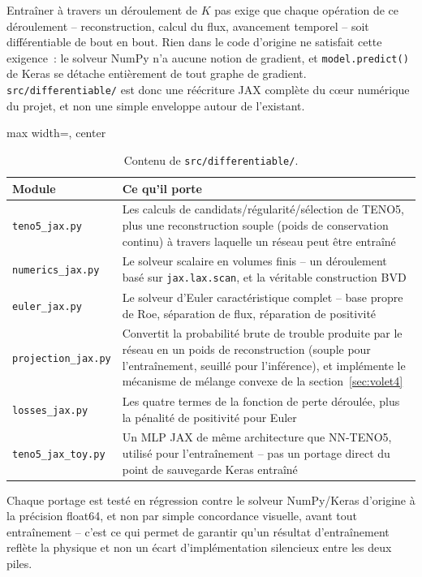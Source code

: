 \documentclass[11pt]{article}
\begin{document}
Entraîner à travers un déroulement de $K$ pas exige que chaque opération
de ce déroulement -- reconstruction, calcul du flux, avancement temporel
-- soit différentiable de bout en bout. Rien dans le code d'origine ne
satisfait cette exigence~: le solveur NumPy n'a aucune notion de
gradient, et \texttt{model.predict()} de Keras se détache entièrement de
tout graphe de gradient. \texttt{src/differentiable/} est donc une
réécriture JAX complète du c\oe{}ur numérique du projet, et non une simple
enveloppe autour de l'existant.

\begin{table}[htbp]
\begin{adjustbox}{max width=\textwidth, center}
\begin{tabular}{ll}
\toprule
\textbf{Module} & \textbf{Ce qu'il porte} \\
\midrule
\texttt{teno5\_jax.py} & Les calculs de candidats/régularité/sélection de
TENO5, plus une reconstruction souple (poids de conservation continu) à
travers laquelle un réseau peut être entraîné \\
\rowrule
\texttt{numerics\_jax.py} & Le solveur scalaire en volumes finis -- un
déroulement basé sur \texttt{jax.lax.scan}, et la véritable construction
BVD \\
\rowrule
\texttt{euler\_jax.py} & Le solveur d'Euler caractéristique complet --
base propre de Roe, séparation de flux, réparation de positivité \\
\rowrule
\texttt{projection\_jax.py} & Convertit la probabilité brute de trouble
produite par le réseau en un poids de reconstruction (souple pour
l'entraînement, seuillé pour l'inférence), et implémente le mécanisme de
mélange convexe de la section~\ref{sec:volet4} \\
\rowrule
\texttt{losses\_jax.py} & Les quatre termes de la fonction de perte
déroulée, plus la pénalité de positivité pour Euler \\
\rowrule
\texttt{teno5\_jax\_toy.py} & Un MLP JAX de même architecture que
NN-TENO5, utilisé pour l'entraînement -- pas un portage direct du point de
sauvegarde Keras entraîné \\
\bottomrule
\end{tabular}
\end{adjustbox}
\caption{Contenu de \texttt{src/differentiable/}.}
\end{table}

Chaque portage est testé en régression contre le solveur NumPy/Keras
d'origine à la précision float64, et non par simple concordance visuelle,
avant tout entraînement -- c'est ce qui permet de garantir qu'un résultat
d'entraînement reflète la physique et non un écart d'implémentation
silencieux entre les deux piles.
\end{document}
